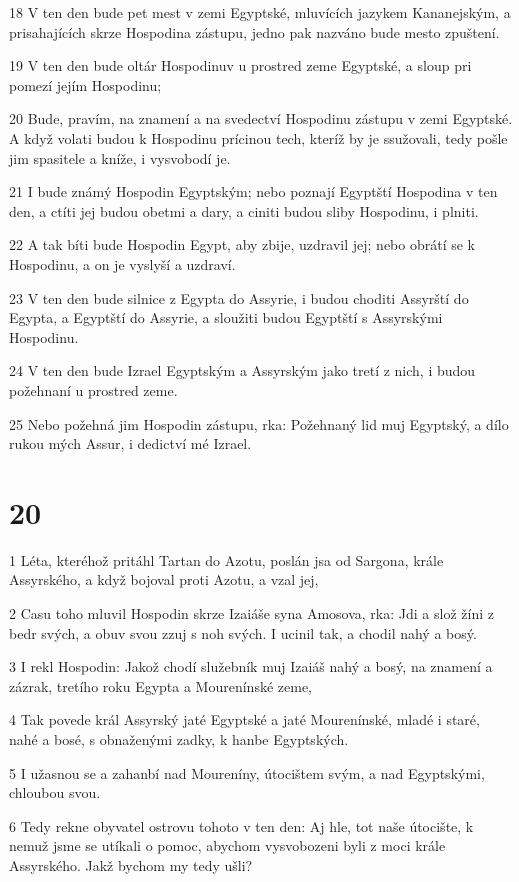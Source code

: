 \par 18 V ten den bude pet mest v zemi Egyptské, mluvících jazykem Kananejským, a prisahajících skrze Hospodina zástupu, jedno pak nazváno bude mesto zpuštení.
\par 19 V ten den bude oltár Hospodinuv u prostred zeme Egyptské, a sloup pri pomezí jejím Hospodinu;
\par 20 Bude, pravím, na znamení a na svedectví Hospodinu zástupu v zemi Egyptské. A když volati budou k Hospodinu prícinou tech, kteríž by je ssužovali, tedy pošle jim spasitele a kníže, i vysvobodí je.
\par 21 I bude známý Hospodin Egyptským; nebo poznají Egyptští Hospodina v ten den, a ctíti jej budou obetmi a dary, a ciniti budou sliby Hospodinu, i plniti.
\par 22 A tak bíti bude Hospodin Egypt, aby zbije, uzdravil jej; nebo obrátí se k Hospodinu, a on je vyslyší a uzdraví.
\par 23 V ten den bude silnice z Egypta do Assyrie, i budou choditi Assyrští do Egypta, a Egyptští do Assyrie, a sloužiti budou Egyptští s Assyrskými Hospodinu.
\par 24 V ten den bude Izrael Egyptským a Assyrským jako tretí z nich, i budou požehnaní u prostred zeme.
\par 25 Nebo požehná jim Hospodin zástupu, rka: Požehnaný lid muj Egyptský, a dílo rukou mých Assur, i dedictví mé Izrael.

\chapter{20}

\par 1 Léta, kteréhož pritáhl Tartan do Azotu, poslán jsa od Sargona, krále Assyrského, a když bojoval proti Azotu, a vzal jej,
\par 2 Casu toho mluvil Hospodin skrze Izaiáše syna Amosova, rka: Jdi a slož žíni z bedr svých, a obuv svou zzuj s noh svých. I ucinil tak, a chodil nahý a bosý.
\par 3 I rekl Hospodin: Jakož chodí služebník muj Izaiáš nahý a bosý, na znamení a zázrak, tretího roku Egypta a Mourenínské zeme,
\par 4 Tak povede král Assyrský jaté Egyptské a jaté Mourenínské, mladé i staré, nahé a bosé, s obnaženými zadky, k hanbe Egyptských.
\par 5 I užasnou se a zahanbí nad Moureníny, útocištem svým, a nad Egyptskými, chloubou svou.
\par 6 Tedy rekne obyvatel ostrovu tohoto v ten den: Aj hle, tot naše útocište, k nemuž jsme se utíkali o pomoc, abychom vysvobozeni byli z moci krále Assyrského. Jakž bychom my tedy ušli?

